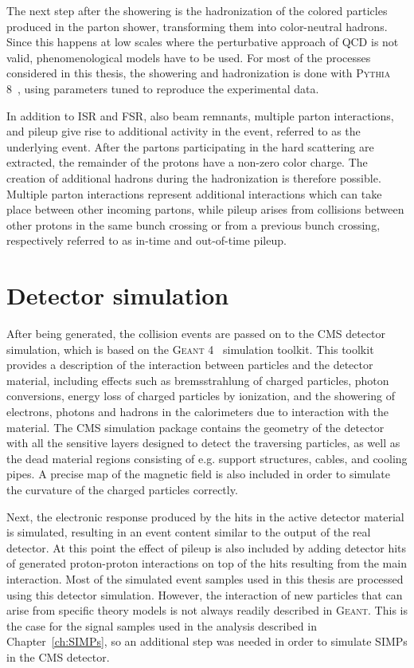 The next step after the showering is the hadronization of the colored particles produced in the parton shower, transforming them into color-neutral hadrons. Since this happens at low scales where the perturbative approach of \acs{QCD} is not valid, phenomenological models have to be used. For most of the processes considered in this thesis, the showering and hadronization is done with \textsc{Pythia 8}~\cite{Sjostrand:2006za}, using parameters tuned to reproduce the experimental data. 

In addition to \ac{ISR} and \ac{FSR}, also beam remnants, multiple parton interactions, and pileup give rise to additional activity in the event, referred to as the underlying event. After the partons participating in the hard scattering are extracted, the remainder of the protons have a non-zero color charge. The creation of additional hadrons during the hadronization is therefore possible. Multiple parton interactions represent additional interactions which can take place between other incoming partons, while pileup arises from collisions between other protons in the same bunch crossing or from a previous bunch crossing, respectively referred to as in-time and out-of-time pileup.

\section{Detector simulation}
\label{sec:sim}


After being generated, the collision events are passed on to the \ac{CMS} detector simulation, which is based on the \textsc{Geant 4}~\cite{} simulation toolkit. This toolkit provides a description of the interaction between particles and the detector material, including effects such as bremsstrahlung of charged particles, photon conversions, energy loss of charged particles by ionization, and the showering of electrons, photons and hadrons in the calorimeters due to interaction with the material. The \ac{CMS} simulation package contains the geometry of the detector with all the sensitive layers designed to detect the traversing particles, as well as the dead material regions consisting of e.g. support structures, cables, and cooling pipes. A precise map of the magnetic field is also included in order to simulate the curvature of the charged particles correctly.

Next, the electronic response produced by the hits in the active detector material is simulated, resulting in an event content similar to the output of the real detector. At this point the effect of pileup is also included by adding detector hits of generated proton-proton interactions on top of the hits resulting from the main interaction. Most of the simulated event samples used in this thesis are processed using this detector simulation. However, the interaction of new particles that can arise from specific theory models is not always readily described in \textsc{Geant}. This is the case for the signal samples used in the analysis described in Chapter~\ref{ch:SIMPs}, so an additional step was needed in order to simulate \acfp{SIMP} in the \ac{CMS} detector. 

